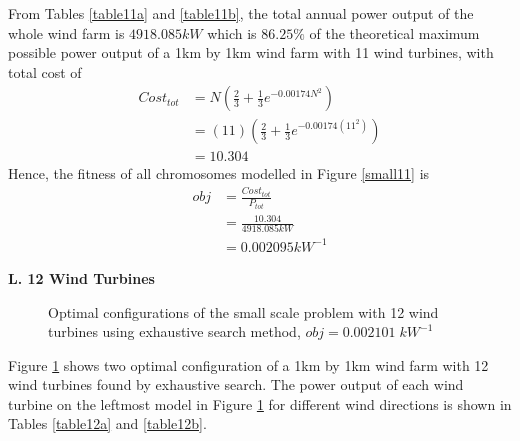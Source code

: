         From Tables \ref{table11a} and \ref{table11b}, the total annual power output of the whole wind farm is $4918.085kW$ which is $86.25\%$ of the theoretical maximum possible power output of a 1km by 1km wind farm with 11 wind turbines, with total cost of
        \begin{align*}
            Cost_{tot}
            &= N\left(\frac{2}{3} + \frac{1}{3}e^{-0.00174N^2}\right) \\
            &= \left(11\right)\left(\frac{2}{3} + \frac{1}{3}e^{-0.00174\left(11^2\right)}\right) \\
            &=10.304
        \end{align*}
        Hence, the fitness of all chromosomes modelled in Figure \ref{small11} is
        \begin{align*}
            obj
            &=\frac{Cost_{tot}}{P_{tot}} \\
            &=\frac{10.304}{4918.085kW} \\
            &=0.002095kW^{-1}
        \end{align*} 
        
    \textbf{L. 12 Wind Turbines}
        \begin{figure}[H]
            \centering
            \qquad
            \caption{Optimal configurations of the small scale problem with 12 wind turbines using exhaustive search method, $obj=0.002101\;kW^{-1}$}
            \label{small12}
        \end{figure}
        
        Figure \ref{small12} shows two optimal configuration of a 1km by 1km wind farm with 12 wind turbines found by exhaustive search. The power output of each wind turbine on the leftmost model in Figure \ref{small12} for different wind directions is shown in Tables \ref{table12a} and \ref{table12b}.
        
